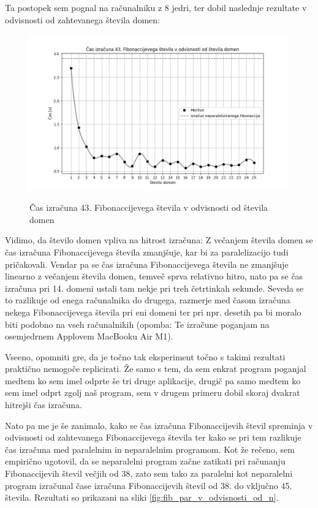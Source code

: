 \documentclass[mat1, tisk]{fmfdelo}
\begin{document}
Ta postopek sem pognal na računalniku z 8 jedri, ter dobil naslednje rezultate v odvisnosti od zahtevanega števila domen:

\begin{figure}[h!]
  \centering
  \caption{Čas izračuna 43. Fibonaccijevega števila v odvisnosti od števila domen}
  \includegraphics[width=13cm]{slike/fib_par_v_odvisnosti_od_domen.jpg}
  \label{fig:fib_par_v_odvisnosti_od_domen}
\end{figure}

Vidimo, da število domen vpliva na hitrost izračuna: Z večanjem števila domen se čas izračuna Fibonaccijevega števila zmanjšuje,
kar bi za paralelizacijo tudi pričakovali. Vendar pa se čas izračuna Fibonaccijevega števila ne zmanjšuje linearno z večanjem števila domen,
temveč sprva relativno hitro, nato pa se čas izračuna pri 14. domeni ustali tam nekje pri treh četrtinkah sekunde.
Seveda se to razlikuje od enega računalnika do drugega, razmerje med časom izračuna nekega Fibonaccijevega števila pri eni domeni ter pri
npr. desetih pa bi moralo biti podobno na vseh računalnikih (opomba: Te izračune poganjam na osemjedrnem Applovem MacBooku Air M1).

Vseeno, opomniti gre, da je točno tak eksperiment točno s takimi rezultati praktično nemogoče replicirati. Že samo s tem, da sem enkrat program poganjal
medtem ko sem imel odprte še tri druge aplikacije, drugič pa samo medtem ko sem imel odprt zgolj naš program, sem v drugem primeru dobil skoraj dvakrat hitrejši čas izračuna.

Nato pa me je še zanimalo, kako se čas izračuna Fibonaccijevih števil spreminja v odvisnosti od zahtevanega Fibonaccijevega števila ter kako se pri tem razlikuje čas izračuna
med paralelnim in neparalelnim programom. Kot že rečeno, sem empirično ugotovil, da se neparalelni program začne zatikati pri računanju Fibonaccijevih števil večjih od 38, zato
sem tako za paralelni kot neparalelni program izračunal čase izračuna Fibonaccijevih števil od 38. do vključno 45. števila. Rezultati so prikazani na 
sliki \ref{fig:fib_par_v_odvisnosti_od_n}.
\end{document}
